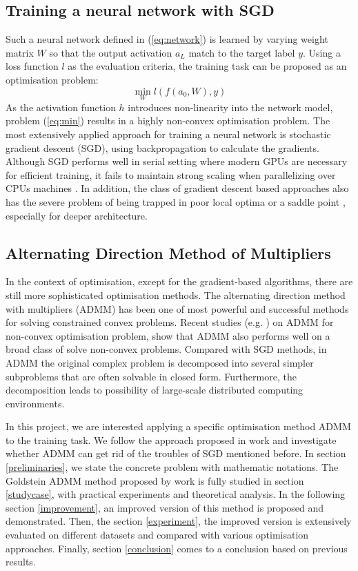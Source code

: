 \documentclass[letterpaper, 10 pt, conference]{ieeeconf}  %
\begin{document}
\subsection{Training a neural network with SGD }
Such a neural network defined in (\ref{eq:network}) is learned by varying weight matrix $W$ so that the output activation $a_L$ match to the target label $y$. Using a loss function $l$ as the evaluation criteria, the training task can be proposed as an optimisation problem:
\begin{equation} \label{eq:min}
	\min_{W} l(f(a_0, W), y)
\end{equation}
As the activation function $h$ introduces non-linearity into the network model, problem (\ref{eq:min}) results in a highly non-convex optimisation problem. The most extensively applied approach for training a neural network is stochastic gradient descent (SGD), using backpropagation to calculate the gradients.  Although SGD performs well in serial setting where modern GPUs are necessary for efficient training, it fails to maintain strong scaling when parallelizing over CPUs machines \cite{2}. In addition, the class of gradient descent based approaches also has the severe problem of being trapped in poor local optima \cite{3} or a saddle point \cite{4}, especially for deeper architecture. 

\subsection{Alternating Direction Method of Multipliers}
In the context of optimisation, except for the gradient-based algorithms, there are still more sophisticated optimisation methods. The alternating direction method with multipliers (ADMM) has been one of most powerful and successful methods for solving constrained convex problems. Recent studies (e.g. \cite{5, 6, 7, 8}) on ADMM for non-convex optimisation problem, show that ADMM also performs well on a broad class of solve non-convex problems. Compared with SGD methods, in ADMM the original complex problem is decomposed into several simpler subproblems that are often solvable in closed form. Furthermore, the decomposition leads to possibility of large-scale distributed computing environments.

In this project, we are interested applying a specific optimisation method ADMM to the training task. We follow the approach proposed in work \cite{9} and investigate whether ADMM can get rid of the troubles of SGD mentioned before.  In section \ref{preliminaries}, we state the concrete problem with mathematic notations. The Goldstein ADMM method proposed by work \cite{9} is fully studied in section \ref{studycase}, with practical experiments and theoretical analysis. In the following section \ref{improvement}, an improved version of this method is proposed and demonstrated. Then, the section \ref{experiment}, the improved version is extensively evaluated on different datasets and compared with various optimisation approaches. Finally, section \ref{conclusion} comes to a conclusion based on previous results.
\end{document}
